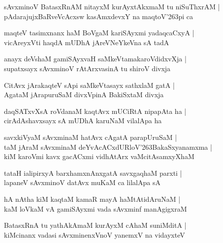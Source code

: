 \begin{shloka}
sAvxminoV BatasxRnAM nitayxM kurAyxtAkxmaM tu niSuThxrAM |\\
pAdarajujxBaRveVcAcxsw kasAmxdevxY na maqtoV\char'263pi ca 
\end{shloka}

\begin{shloka}
maqteV tasimxnanx haM BoVgaM kariSAyxmi yadaqcaCxyA |\\
vicAreyxVti haqdA mUDhA jAreVNeYkeVna sA tadA
\end{shloka}

\begin{shloka}
anayx deVshaM gamiSAyxvaH saMkeVtamakaroVdidxvXja |\\
supatxsayx sAvxminoV rAtArxvasinA tu shiroV divxja
\end{shloka}

\begin{shloka}
CitAvx jArakaqteV sApi saMkeVtasayx sathxlaM gatA |\\
AgataM jArapuruSaM divxVpinA BakiSxtaM divxja
\end{shloka}

\begin{shloka}
daqSATxvXsA roVdanaM kaqtAvx mUCiRtA nipapAta ha |\\
cirAdAshavxsayx sA mUDhA karuNaM vilalApa ha 
\end{shloka}

\begin{shloka}
savxkiVyaM sAvxminaM hatAvx cAgatA parapUruSaM |\\
taM jAraM sAvxminaM deYvAcACxdURloV\char'263BakaSxyanamxma |\\
kiM karoVmi kavx gacACxmi vidhAtArx vaMcitAsamxyXhaM 
\end{shloka}

\begin{shloka}
tataH ialipirxyA barxhamxnAnxgatA savxgaqhaM parxti |\\
lapaneV sAvxminoV datAvx muKaM ca lilalApa sA
\end{shloka}

\begin{shloka}
hA nAtha kiM kaqtaM kamaR mayA haMtAtidAruNaM |\\
kaM loVkaM vA gamiSAyxmi vada sAvxminf manAgigxraM 
\end{shloka}

\begin{shloka}
BatasxRnA tu yathAkAmaM kurAyxM cAhaM suniMditA |\\
kiMcinanx vadasi sAvxminenxVnoV yanemxV na vidayxteV 
\end{shloka}

